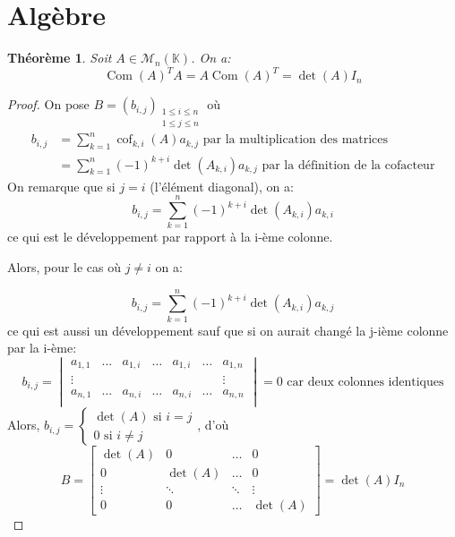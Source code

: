 \documentclass[a4paper]{article}
\newtheorem{theoreme}{Théorème}[section]
\begin{document}
\section{Algèbre}
\begin{theoreme}
    Soit $A \in \mathcal{M}_n(\mathbb{K})$. On a:
    \[
        \operatorname{Com}(A)^{T}A = A\operatorname{Com}(A)^{T} = \det(A)I_n
    \] 
\end{theoreme}
\begin{proof}
    On pose $B = (b_{i, j})_{\substack{1 \le i \le n \\ 1 \le j \le n}}$ où
    \begin{align*}
        b_{i, j} &= \sum_{k=1}^{n} \operatorname{cof}_{k,i}(A)a_{k,j} \text{ par la multiplication des matrices}\\
                 &= \sum_{k=1}^{n} (-1)^{k+i}\det(A_{k,i})a_{k,j} \text{ par la définition de la cofacteur}
    \end{align*}
    On remarque que si $j = i$ (l'élément diagonal), on a:
     \[
    b_{i, j} = \sum_{k=1}^{n} (-1)^{k+i}\det(A_{k,i})a_{k,i} 
    \] 
    ce qui est le développement par rapport à la i-ème colonne.
    \par
    Alors, pour le cas où $j \neq i$ on a:

    \[
        b_{i, j} = \sum_{k=1}^{n} (-1)^{k+i}\det(A_{k,i})a_{k,j} 
    \] 
    ce qui est aussi un développement sauf que si on aurait changé la j-ième colonne par la i-ème:
    \[
        b_{i, j} = 
        \begin{vmatrix} 
            a_{1, 1} & \ldots & a_{1, i} & \ldots & a_{1, i} & \ldots & a_{1, n}\\
            \vdots   &        &          &        &          &        & \vdots \\
            a_{n, 1} & \ldots & a_{n, i} & \ldots & a_{n, i} & \ldots & a_{n, n}\\
        \end{vmatrix} = 0 \text{ car deux colonnes identiques}
    \] 
    Alors, $b_{i, j} = \begin{cases}
        \det(A) \text{ si } i = j\\
        0 \text{ si } i \neq  j
    \end{cases}$, d'où
    \[
    B = \begin{bmatrix} 
        \det(A) & 0 & \ldots & 0\\
        0       & \det(A) & \ldots & 0\\
        \vdots  & \ddots  & \ddots & \vdots\\
        0       & 0       & \ldots & \det(A) 
    \end{bmatrix}  = \det(A)I_n
    \] 
\end{proof}
\end{document}
